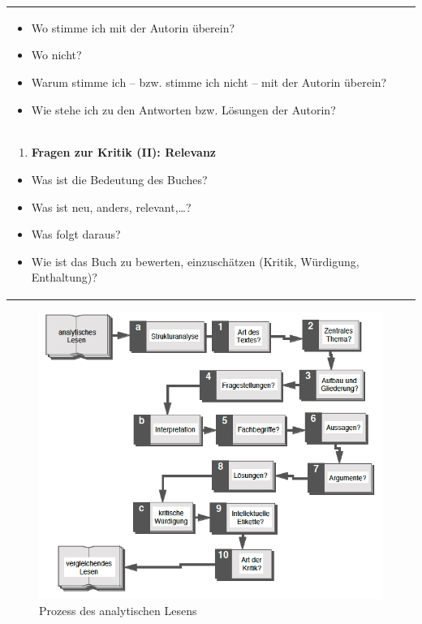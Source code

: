 \documentclass[]{book}
\providecommand{\tightlist}{%
  \setlength{\itemsep}{0pt}\setlength{\parskip}{0pt}}
\theoremstyle{definition}
\theoremstyle{definition}
\theoremstyle{definition}
\theoremstyle{remark}
\begin{document}
\begin{longtable}[]{@{}l@{}}
\begin{minipage}[t]{0.97\columnwidth}
\begin{itemize}
\tightlist
\item
  Wo stimme ich mit der Autorin überein?
\item
  Wo nicht?
\item
  Warum stimme ich -- bzw. stimme ich nicht -- mit der Autorin überein?
\item
  Wie stehe ich zu den Antworten bzw. Lösungen der Autorin?
\end{itemize}\strut
\end{minipage}\tabularnewline
\begin{minipage}[t]{0.97\columnwidth}\raggedright\strut
\begin{enumerate}
\def\labelenumi{\arabic{enumi}.}
\setcounter{enumi}{3}
\tightlist
\item
  \textbf{Fragen zur Kritik (II): Relevanz}
\end{enumerate}

\begin{itemize}
\tightlist
\item
  Was ist die Bedeutung des Buches?
\item
  Was ist neu, anders, relevant,\ldots{}?
\item
  Was folgt daraus?
\item
  Wie ist das Buch zu bewerten, einzuschätzen (Kritik, Würdigung,
  Enthaltung)?
\end{itemize}\strut
\end{minipage}\tabularnewline
\bottomrule
\end{longtable}

\begin{figure}

{\centering \includegraphics{images/lesen-analytisches-min} 

}

\caption{Prozess des analytischen Lesens}\label{fig:unnamed-chunk-17}
\end{figure}
\end{document}
